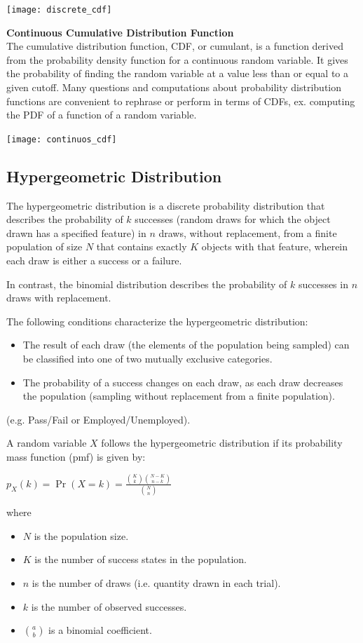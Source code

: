 \documentclass{article}
\begin{document}
\texttt{[image: discrete\_cdf]}

\textbf{Continuous Cumulative Distribution Function} \\
The cumulative distribution function, CDF, or cumulant, is a function derived from the probability density function for a continuous random variable. It gives the probability of finding the random variable at a value less than or equal to a given cutoff. Many questions and computations about probability distribution functions are convenient to rephrase or perform in terms of CDFs, ex. computing the PDF of a function of a random variable.

\texttt{[image: continuos\_cdf]}

\subsection{Hypergeometric Distribution}
The hypergeometric distribution is a discrete probability distribution that describes the probability of $k$ successes (random draws for which the object drawn has a specified feature) in $n$ draws, without replacement, from a finite population of size $N$ that contains exactly 
$K$ objects with that feature, wherein each draw is either a success or a failure. 

In contrast, the binomial distribution describes the probability of $k$ successes in $n$ draws with replacement.

The following conditions characterize the hypergeometric distribution:
\begin{itemize}
    \item The result of each draw (the elements of the population being sampled) can be classified into one of two mutually exclusive categories.
    \item The probability of a success changes on each draw, as each draw decreases the population (sampling without replacement from a finite population).
\end{itemize}

 (e.g. Pass/Fail or Employed/Unemployed).

A random variable $X$ follows the hypergeometric distribution if its probability mass function (pmf) is given by:

$ \displaystyle p_{X}(k)=\Pr(X=k)={\frac {{\binom {K}{k}}{\binom {N-K}{n-k}}}{\binom {N}{n}}} $

where
\begin{itemize}
    \item $N$ is the population size.
    \item $K$ is the number of success states in the population.
    \item $n$ is the number of draws (i.e. quantity drawn in each trial).
    \item $k$ is the number of observed successes.
    \item $\genfrac{(}{)}{0pt}{}{a}{b}$ is a binomial coefficient.
\end{itemize}
\end{document}
